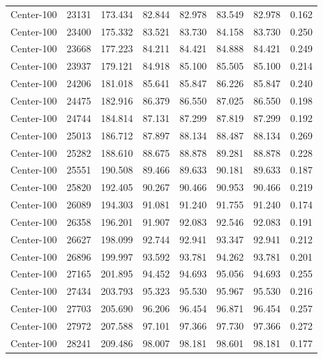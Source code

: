 \begin{longtable}{lrrrrrrr}
Center-100 & 23131 & 173.434 & 82.844 & 82.978 & 83.549 & 82.978 & 0.162\\
Center-100 & 23400 & 175.332 & 83.521 & 83.730 & 84.158 & 83.730 & 0.250\\
Center-100 & 23668 & 177.223 & 84.211 & 84.421 & 84.888 & 84.421 & 0.249\\
Center-100 & 23937 & 179.121 & 84.918 & 85.100 & 85.505 & 85.100 & 0.214\\
Center-100 & 24206 & 181.018 & 85.641 & 85.847 & 86.226 & 85.847 & 0.240\\
Center-100 & 24475 & 182.916 & 86.379 & 86.550 & 87.025 & 86.550 & 0.198\\
Center-100 & 24744 & 184.814 & 87.131 & 87.299 & 87.819 & 87.299 & 0.192\\
Center-100 & 25013 & 186.712 & 87.897 & 88.134 & 88.487 & 88.134 & 0.269\\
Center-100 & 25282 & 188.610 & 88.675 & 88.878 & 89.281 & 88.878 & 0.228\\
Center-100 & 25551 & 190.508 & 89.466 & 89.633 & 90.181 & 89.633 & 0.187\\
Center-100 & 25820 & 192.405 & 90.267 & 90.466 & 90.953 & 90.466 & 0.219\\
Center-100 & 26089 & 194.303 & 91.081 & 91.240 & 91.755 & 91.240 & 0.174\\
Center-100 & 26358 & 196.201 & 91.907 & 92.083 & 92.546 & 92.083 & 0.191\\
Center-100 & 26627 & 198.099 & 92.744 & 92.941 & 93.347 & 92.941 & 0.212\\
Center-100 & 26896 & 199.997 & 93.592 & 93.781 & 94.262 & 93.781 & 0.201\\
Center-100 & 27165 & 201.895 & 94.452 & 94.693 & 95.056 & 94.693 & 0.255\\
Center-100 & 27434 & 203.793 & 95.323 & 95.530 & 95.967 & 95.530 & 0.216\\
Center-100 & 27703 & 205.690 & 96.206 & 96.454 & 96.871 & 96.454 & 0.257\\
Center-100 & 27972 & 207.588 & 97.101 & 97.366 & 97.730 & 97.366 & 0.272\\
Center-100 & 28241 & 209.486 & 98.007 & 98.181 & 98.601 & 98.181 & 0.177\\
\end{longtable}
